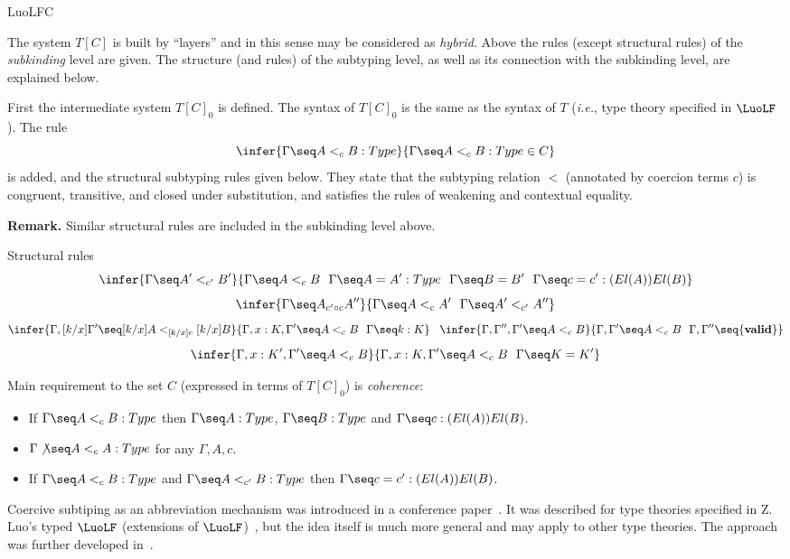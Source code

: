 \begin{entry}{LuoLFC}
\begin{clarifications}
The system $T[C]$ is built by ``layers''
and in this sense may be considered as {\em hybrid}. Above the rules
(except structural rules) of the {\em subkinding} level are given. 
The structure (and rules)
of the subtyping level, as well as its connection with the 
subkinding level, are explained below. 

First the intermediate system $T[C]_0$ is defined. 
The syntax of $T[C]_0$ is the same
as the syntax of $T$ ({\em i.e.}, type theory specified in $\LuoLF$). The rule
 $$\infer{\Gamma\seq A<_cB:Type}{\Gamma\seq A<_cB:Type\in C}$$ is added, 
and the structural subtyping rules
given below.  They state that the subtyping relation $<$ (annotated
by coercion terms $c$) is congruent, transitive, and closed under
substitution, and satisfies the rules of weakening and contextual equality.

{\bf Remark.} Similar structural rules are included in the subkinding level 
above. 
 
\end{clarifications}
	
\begin{calculus}
	
\centering
Structural rules
$$
\infer{\Gamma\seq A'<_{c'}B'}{\Gamma\seq A<_cB\!\quad\!\Gamma\seq A=A':Type
\!\quad\!\Gamma\seq B=B'\!\quad\!\Gamma\seq c=c':(El(A))El(B)}
$$
$$\infer{\Gamma\seq A_{c'\circ c}A''}{\Gamma\seq A<_cA'\!\quad\!\Gamma\seq A'<_{c'}A''}$$
$$\infer{\Gamma, [k/x]\Gamma'\seq [k/x]A<_{[k/x]c}[k/x]B}{\Gamma, x:K, \Gamma'\seq A<_c B
\!\quad\!\Gamma\seq k:K}\,\,\,\,\,\infer{\Gamma, \Gamma'',\Gamma'\seq A<_cB}{\Gamma, \Gamma'\seq A<_cB\!\quad\!\Gamma, 
\Gamma''\seq {\bf valid}}$$
$$\infer{\Gamma, x:K', \Gamma'\seq A<_c B}{\Gamma, x:K, \Gamma'\seq A<_c B
\!\quad\!\Gamma \seq K=K'}$$
	
	\end{calculus}

Main requirement to the set $C$ (expressed in terms of $T[C]_0$) is {\em coherence}:
\begin{itemize}
\item If $\Gamma\seq A<_cB:Type$ then $\Gamma\seq A:Type$, $\Gamma\seq B:Type$ and $\Gamma\seq c: (El(A))El(B)$.
\item $\Gamma\not\seq A<_cA:Type$ for any $\Gamma, A, c$.
\item If $\Gamma\seq A<_c B:Type$ and $\Gamma\seq A<_{c'}B:Type$ then $\Gamma\seq c=c':(El(A))El(B)$.
\end{itemize}

	\begin{history}
Coercive subtiping as an abbreviation mechanism
was introduced in a conference paper~\cite{Luo96:CSL}.  
It was described for type theories specified in Z. Luo's typed $\LuoLF$
(extensions of $\LuoLF$)~, but
the idea itself is much more general and may apply
to other type theories. The approach was further
developed in~\cite{jls:TYPES96, Luo:99, SolLuo:02, LuoSolXue:13}.


\end{history}
\end{entry}
